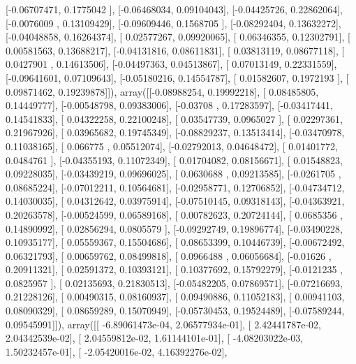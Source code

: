 \documentclass{article}
\begin{document}
       [-0.06707471,  0.1775042 ],
       [-0.06468034,  0.09104043],
       [-0.04425726,  0.22862064],
       [-0.0076009 ,  0.13109429],
       [-0.09609446,  0.1568705 ],
       [-0.08292404,  0.13632272],
       [-0.04048858,  0.16264374],
       [ 0.02577267,  0.09920065],
       [ 0.06346355,  0.12302791],
       [ 0.00581563,  0.13688217],
       [-0.04131816,  0.08611831],
       [ 0.03813119,  0.08677118],
       [ 0.0427901 ,  0.14613506],
       [-0.04497363,  0.04513867],
       [ 0.07013149,  0.22331559],
       [-0.09641601,  0.07109643],
       [-0.05180216,  0.14554787],
       [ 0.01582607,  0.1972193 ],
       [ 0.09871462,  0.19239878]]), array([[-0.08988254,  0.19992218],
       [ 0.08485805,  0.14449777],
       [-0.00548798,  0.09383006],
       [-0.03708   ,  0.17283597],
       [-0.03417441,  0.14541833],
       [ 0.04322258,  0.22100248],
       [ 0.03547739,  0.0965027 ],
       [ 0.02297361,  0.21967926],
       [ 0.03965682,  0.19745349],
       [-0.08829237,  0.13513414],
       [-0.03470978,  0.11038165],
       [ 0.066775  ,  0.05512074],
       [-0.02792013,  0.04648472],
       [ 0.01401772,  0.0484761 ],
       [-0.04355193,  0.11072349],
       [ 0.01704082,  0.08156671],
       [ 0.01548823,  0.09228035],
       [-0.03439219,  0.09696025],
       [ 0.0630688 ,  0.09213585],
       [-0.0261705 ,  0.08685224],
       [-0.07012211,  0.10564681],
       [-0.02958771,  0.12706852],
       [-0.04734712,  0.14030035],
       [ 0.04312642,  0.03975914],
       [-0.07510145,  0.09318143],
       [-0.04363921,  0.20263578],
       [-0.00524599,  0.06589168],
       [ 0.00782623,  0.20724144],
       [ 0.0685356 ,  0.14890992],
       [ 0.02856294,  0.0805579 ],
       [-0.09292749,  0.19896774],
       [-0.03490228,  0.10935177],
       [ 0.05559367,  0.15504686],
       [ 0.08653399,  0.10446739],
       [-0.00672492,  0.06321793],
       [ 0.00659762,  0.08499818],
       [ 0.0966488 ,  0.06056684],
       [-0.01626   ,  0.20911321],
       [ 0.02591372,  0.10393121],
       [ 0.10377692,  0.15792279],
       [-0.0121235 ,  0.0825957 ],
       [ 0.02135693,  0.21830513],
       [-0.05482205,  0.07869571],
       [-0.07216693,  0.21228126],
       [ 0.00490315,  0.08160937],
       [ 0.09490886,  0.11052183],
       [ 0.00941103,  0.08090329],
       [ 0.08659289,  0.15070949],
       [-0.05730453,  0.19524489],
       [-0.07589244,  0.09545991]]), array([[ -6.89061473e-04,   2.06577934e-01],
       [  2.42441787e-02,   2.04342539e-02],
       [  2.04559812e-02,   1.61144101e-01],
       [ -4.08203022e-03,   1.50232457e-01],
       [ -2.05420016e-02,   4.16392276e-02],
\end{document}
